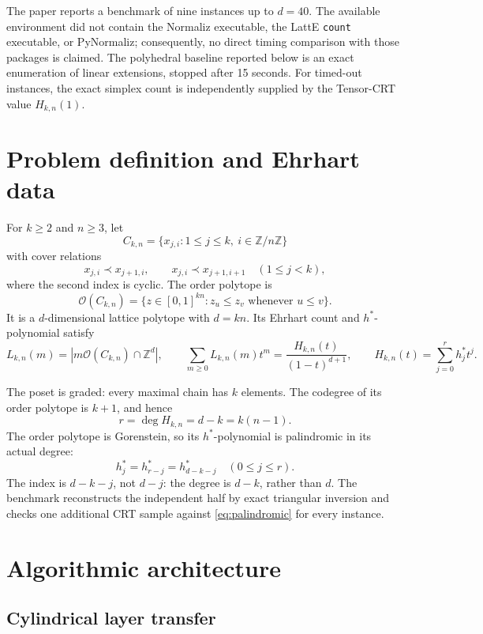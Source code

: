 \documentclass[11pt]{article}
\newcommand{\Ocal}{\mathcal{O}}
\newcommand{\Z}{\mathbb{Z}}
\begin{document}
The paper reports a benchmark of nine instances up to $d=40$.  The available
environment did not contain the Normaliz executable, the LattE \texttt{count}
executable, or PyNormaliz; consequently, no direct timing comparison with
those packages is claimed.  The polyhedral baseline reported below is an
exact enumeration of linear extensions, stopped after 15 seconds.  For
timed-out instances, the exact simplex count is independently supplied by
the Tensor-CRT value $H_{k,n}(1)$.

\section{Problem definition and Ehrhart data}

For $k\geq 2$ and $n\geq 3$, let
\[
  C_{k,n}=\{x_{j,i}:1\leq j\leq k,\ i\in\Z/n\Z\}
\]
with cover relations
\[
  x_{j,i}\prec x_{j+1,i},
  \qquad
  x_{j,i}\prec x_{j+1,i+1}
  \quad (1\leq j<k),
\]
where the second index is cyclic.  The order polytope is
\[
  \Ocal(C_{k,n})=
  \{z\in[0,1]^{kn}: z_u\leq z_v\text{ whenever }u\leq v\}.
\]
It is a $d$-dimensional lattice polytope with $d=kn$.  Its Ehrhart count and
$h^*$-polynomial satisfy
\begin{equation}
  L_{k,n}(m)=|m\Ocal(C_{k,n})\cap\Z^d|,
  \qquad
  \sum_{m\geq0}L_{k,n}(m)t^m
  =\frac{H_{k,n}(t)}{(1-t)^{d+1}},
  \qquad
  H_{k,n}(t)=\sum_{j=0}^{r}h_j^*t^j.
  \label{eq:ehrhart}
\end{equation}

The poset is graded: every maximal chain has $k$ elements.  The codegree of
its order polytope is $k+1$, and hence
\[
  r=\deg H_{k,n}=d-k=k(n-1).
\]
The order polytope is Gorenstein, so its $h^*$-polynomial is palindromic in
its actual degree:
\begin{equation}
  h_j^*=h_{r-j}^*=h_{d-k-j}^*
  \quad (0\leq j\leq r).
  \label{eq:palindromic}
\end{equation}
The index is $d-k-j$, not $d-j$: the degree is $d-k$, rather than $d$.
The benchmark reconstructs the independent half by exact triangular
inversion and checks one additional CRT sample against
\eqref{eq:palindromic} for every instance.

\section{Algorithmic architecture}

\subsection{Cylindrical layer transfer}
\end{document}
